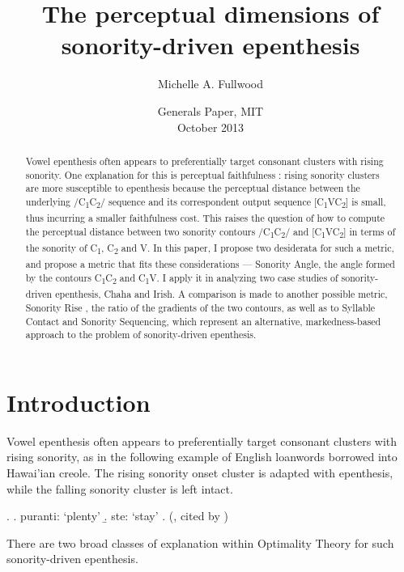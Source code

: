 \documentclass[12pt]{article}
\title{The perceptual dimensions of \\ sonority-driven epenthesis}
\author{Michelle A. Fullwood}
\date{Generals Paper, MIT \\ October 2013}
\begin{document}
\maketitle

\begin{abstract}
 
Vowel epenthesis often appears to preferentially target consonant clusters with rising sonority.
One explanation for this is perceptual faithfulness \citep{fleischhacker.2002,steriade.2006}: rising sonority clusters are more susceptible to epenthesis because the perceptual distance between the underlying /C\textsubscript{1}C\textsubscript{2}/ sequence and its correspondent output sequence [C\textsubscript{1}VC\textsubscript{2}] is small, thus incurring a smaller faithfulness cost.
This raises the question of how to compute the perceptual distance between two sonority contours /C\textsubscript{1}C\textsubscript{2}/ and [C\textsubscript{1}VC\textsubscript{2}] in terms of the sonority of C\textsubscript{1}, C\textsubscript{2} and V.  
In this paper, I propose two desiderata for such a metric, and propose a metric that fits these considerations --- {\sc Sonority Angle}, the angle formed by the contours C\textsubscript{1}C\textsubscript{2} and C\textsubscript{1}V. I apply it in analyzing two case studies of sonority-driven epenthesis, Chaha and Irish.  A comparison is made to another possible metric,
{\sc Sonority Rise} \citep{flemming.2008}, the ratio of the gradients of the two contours, as well as to Syllable Contact and Sonority Sequencing, which represent an alternative, markedness-based approach to the problem of sonority-driven epenthesis. 
\end{abstract}

\newpage
\tableofcontents
\newpage

\section{Introduction}

Vowel epenthesis often appears to preferentially target consonant clusters with rising sonority, as in the following example of English loanwords borrowed into Hawai'ian creole. The rising sonority onset cluster is adapted with epenthesis, while the falling sonority cluster is left intact.

\ex. \a. puranti: `plenty'
    \b. ste: `stay'
    \z.
    (\cite{nagara.1972}, cited by \cite{fleischhacker.2005})

There are two broad classes of explanation within Optimality Theory for such sonority-driven epenthesis.
\end{document}
